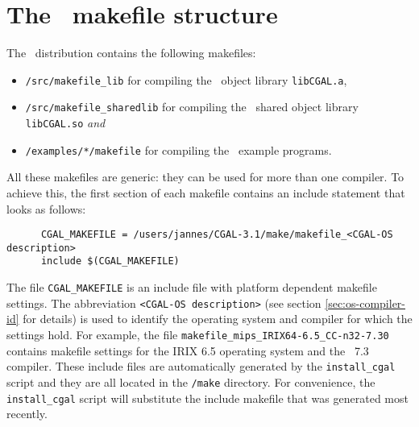 \section{The \cgal\ makefile structure}\label{sec:makefiles}

The \cgal\ distribution contains the following makefiles:
\begin{itemize}
\item \texttt{\cgaldir/src/makefile\_lib} for compiling the \cgal\ 
  object library \texttt{libCGAL.a},
  
\item \texttt{\cgaldir/src/makefile\_sharedlib} for compiling the
  \cgal\ shared object library \texttt{libCGAL.so}
  \textit{and}
  
\item \texttt{\cgaldir/examples/*/makefile} for compiling the \cgal\ 
  example programs.
\end{itemize}

All these makefiles are generic: they can be used for more than one
compiler.  To achieve this, the first section of each makefile
contains an include statement that looks as follows:

\begin{verbatim}
      CGAL_MAKEFILE = /users/jannes/CGAL-3.1/make/makefile_<CGAL-OS description>
      include $(CGAL_MAKEFILE)
\end{verbatim}

The file \texttt{CGAL\_MAKEFILE} is an include
file with platform dependent makefile
settings. The abbreviation \texttt{<CGAL-OS description>} (see section
\ref{sec:os-compiler-id} for details) is used to identify the
operating system and compiler for which the settings hold. For
example, the file \texttt{makefile\_mips\_IRIX64-6.5\_CC-n32-7.30}
contains makefile settings for the IRIX 6.5 operating system and the
\mipsprocc\ 7.3 compiler.  These include files are automatically
generated by the \texttt{install\_cgal} script and they are all
located in the \texttt{\cgaldir/make} directory.  For convenience, the
\texttt{install\_cgal} script will substitute the include makefile
that was generated most recently.


